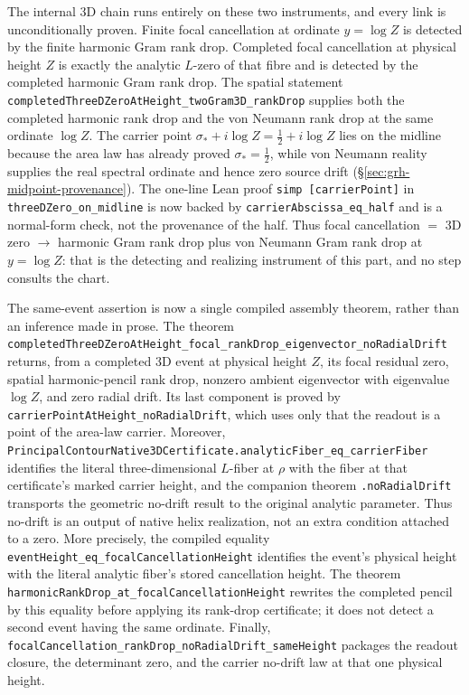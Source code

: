 \documentclass[11pt]{article}
\theoremstyle{definition}
\begin{document}
The internal 3D chain runs entirely on these two instruments, and every link
is unconditionally proven.  Finite focal cancellation at ordinate
\(y=\log Z\) is detected by the finite harmonic Gram rank drop.  Completed
focal cancellation at physical height \(Z\) is exactly the analytic
\(L\)-zero of that fibre and is detected by the completed harmonic Gram rank
drop.  The spatial statement
\texttt{completedThreeDZeroAtHeight\_twoGram3D\_rankDrop} supplies both the
completed harmonic rank drop and the von Neumann rank drop at the same
ordinate \(\log Z\).  The carrier point
\(\sigma_*+i\log Z=\tfrac12+i\log Z\) lies on the midline because the area law has
already proved \(\sigma_*=\tfrac12\), while von Neumann reality supplies the
real spectral ordinate and hence zero source drift
(\S\ref{sec:grh-midpoint-provenance}).  The one-line Lean proof
\texttt{simp [carrierPoint]} in \texttt{threeDZero\_on\_midline} is now
backed by \texttt{carrierAbscissa\_eq\_half} and is a
normal-form check, not the provenance of the half. Thus focal
cancellation \(=\) 3D zero \(\to\) harmonic Gram rank drop plus von Neumann
Gram rank drop at \(y=\log Z\): that is the detecting and realizing
instrument of this part, and no step consults the chart.

The same-event assertion is now a single compiled assembly theorem, rather
than an inference made in prose.  The theorem
\texttt{completedThreeDZeroAtHeight\_focal\_rankDrop\_eigenvector\_noRadialDrift}
returns, from a completed 3D event at physical height \(Z\), its focal residual
zero, spatial harmonic-pencil rank drop, nonzero ambient eigenvector with
eigenvalue \(\log Z\), and zero radial drift.  Its last component is proved by
\texttt{carrierPointAtHeight\_noRadialDrift}, which uses only that the readout
is a point of the area-law carrier.  Moreover,
\texttt{PrincipalContourNative3DCertificate.analyticFiber\_eq\_carrierFiber}
identifies the literal three-dimensional \(L\)-fiber at \(\rho\) with the
fiber at that certificate's marked carrier height, and the companion theorem
\texttt{.noRadialDrift} transports the geometric no-drift result to the
original analytic parameter.  Thus no-drift is an output of native helix
realization, not an extra condition attached to a zero.
More precisely, the compiled equality
\texttt{eventHeight\_eq\_focalCancellationHeight} identifies the event's
physical height with the literal analytic fiber's stored cancellation height.
The theorem \texttt{harmonicRankDrop\_at\_focalCancellationHeight} rewrites the
completed pencil by this equality before applying its rank-drop certificate;
it does not detect a second event having the same ordinate.  Finally,
\texttt{focalCancellation\_rankDrop\_noRadialDrift\_sameHeight} packages the
readout closure, the determinant zero, and the carrier no-drift law at that one
physical height.
\end{document}
